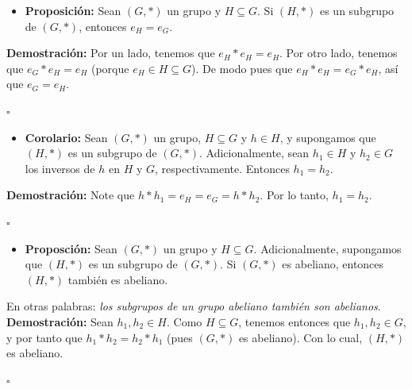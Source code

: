 \documentclass[10 pt]{article}
\begin{document}
\begin{itemize}
    \item \Large{\textbf{Proposición:} Sean $(G,*)$ un grupo y $H \subseteq G$. Si $(H,*)$ es un subgrupo de $(G,*)$, entonces $e_H=e_G$.} \\
\end{itemize}

\Large{\textbf{Demostración:} Por un lado, tenemos que $e_H*e_H=e_H$. Por otro lado, tenemos que $e_G*e_H=e_H$ (porque $e_H \in H \subseteq G$). De modo pues que $e_H*e_H=e_G*e_H$, así que $e_G=e_H$.} \\

\begin{flushright}
    $\square$
\end{flushright}

\begin{itemize}
    \item \Large{\textbf{Corolario:} Sean $(G,*)$ un grupo, $H \subseteq G$ y $h \in H$, y supongamos que $(H,*)$ es un subgrupo de $(G,*)$. Adicionalmente, sean $h_1 \in H$ y $h_2 \in G$ los inversos de $h$ en $H$ y $G$, respectivamente. Entonces $h_1=h_2$.} \\
\end{itemize}

\Large{\textbf{Demostración:} Note que $h*h_1=e_H=e_G=h*h_2$. Por lo tanto, $h_1=h_2$.} \\

\begin{flushright}
    $\square$
\end{flushright}

\begin{itemize}
    \item \Large{\textbf{Proposción:} Sean $(G,*)$ un grupo y $H \subseteq G$. Adicionalmente, supongamos que $(H,*)$ es un subgrupo de $(G,*)$. Si $(G,*)$ es abeliano, entonces $(H,*)$ también es abeliano.} \\
\end{itemize}

\Large{En otras palabras: \textit{los subgrupos de un grupo abeliano también son abelianos}.} \\

\Large{\textbf{Demostración:} Sean $h_1,h_2 \in H$. Como $H \subseteq G$, tenemos entonces que $h_1,h_2 \in G$, y por tanto que $h_1*h_2=h_2*h_1$ (pues $(G,*)$ es abeliano). Con lo cual, $(H,*)$ es abeliano.} \\

\begin{flushright}
    $\square$
\end{flushright}
\end{document}
